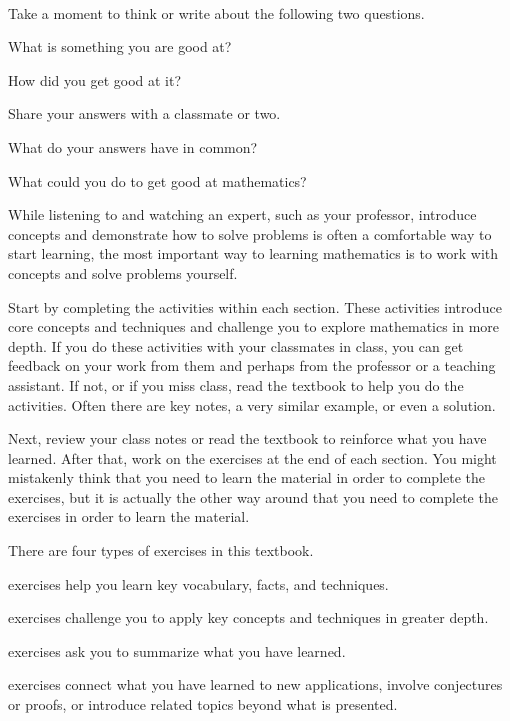 \begin{act}
\label{act_good_at}
~
    \begin{actpart}
        \item Take a moment to think or write about the following two questions. 
            \begin{bull}
                \item What is something you are good at?
                \item How did you get good at it?
            \end{bull}
        \item Share your answers with a classmate or two. 
        \item What do your answers have in common?
        \item What could you do to get good at mathematics?
    \end{actpart}   
\end{act}

While listening to and watching an expert, such as your professor, introduce concepts and demonstrate how to solve problems is often a comfortable way to start learning, the most important way to learning mathematics is to work with concepts and solve problems yourself.  

Start by completing the activities within each section. 
 These activities introduce core concepts and techniques and challenge you to explore mathematics in more depth. If you do these activities with your classmates in class, you can get feedback on your work from them and perhaps from the professor or a teaching assistant.  If not, or if you miss class, read the textbook to help you do the activities.  Often there are key notes, a very similar example, or even a solution.

Next, review your class notes or read the textbook to reinforce what you have learned.  After that, work on the exercises at the end of each section. You might mistakenly think that you need to learn the material in order to complete the exercises, but it is actually the other way around that you need to complete the exercises in order to learn the material.

There are four types of exercises in this textbook.  
\begin{bull}
    \item {} exercises help you learn key vocabulary, facts, and techniques.  
    \item {} exercises challenge you to apply key concepts and techniques in greater depth.
    \item {} exercises ask you to summarize what you have learned. 
    \item {} exercises connect what you have learned to new applications, involve conjectures or proofs, or introduce related topics beyond what is presented.
\end{bull}

